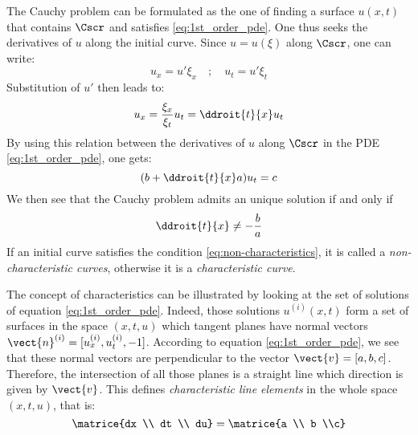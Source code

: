 The Cauchy problem can be formulated as the one of finding a surface $u(x,t)$ that contains $\Cscr$ and satisfies \eqref{eq:1st_order_pde}. One thus seeks the derivatives of $u$ along the initial curve. Since $u=u(\xi)$ along $\Cscr$, one can write:
\begin{equation*}
  u_x = u' \xi_x \quad ; \quad u_t = u' \xi_t
\end{equation*}
Substitution of $u'$ then leads to:
\begin{equation*}
  u_x = \frac{\xi_x}{\xi_t}u_t = \ddroit{t}{x} u_t
\end{equation*}
By using this relation between the derivatives of $u$ along $\Cscr$ in the PDE \eqref{eq:1st_order_pde}, one gets:
\begin{equation}
  \label{eq:normal_form_pde}
  (b + \ddroit{t}{x}a)u_t = c
\end{equation}
We then see that the Cauchy problem admits an unique solution if and only if
\begin{equation}
  \label{eq:non-characteristics}
  \ddroit{t}{x}\neq -\frac{b}{a}
\end{equation}
If an initial curve satisfies the condition \eqref{eq:non-characteristics}, it is called a \textit{non-characteristic curves}, otherwise it is a \textit{characteristic curve}. 

The concept of characteristics can be illustrated by looking at the set of solutions of equation \eqref{eq:1st_order_pde}. Indeed, those solutions $u^{(i)}(x,t)$ form a set of surfaces in the space $(x,t,u)$ which tangent planes have normal vectors $\vect{n}^{(i)}=[u^{(i)}_x,u^{(i)}_t,-1]$. According to equation \eqref{eq:1st_order_pde}, we see that these normal vectors are perpendicular to the vector $\vect{v}=[a,b,c]$. Therefore, the intersection of all those planes is a straight line which direction is given by $\vect{v}$. This defines \textit{characteristic line elements} in the whole space $(x,t,u)$, that is:
\begin{equation}
  \label{eq:monge_axis}
  \matrice{dx \\ dt \\ du} = \matrice{a \\ b \\c}
\end{equation}


